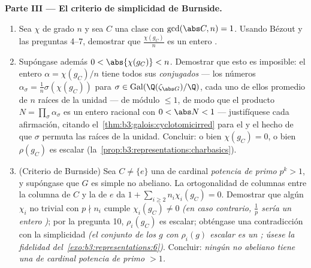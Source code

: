 \begin{problem}
\medskip
\noindent\textbf{Parte III --- El criterio de simplicidad de Burnside.}
\begin{enumerate}[resume]
  \item Sea $\chi$  de
  grado $n$ y sea $C$ una clase con $\gcd(\abs C, n) = 1$. Usando Bézout
  y las preguntas 4--7, demostrar que $\frac{\chi(g_C)}{n}$ es un entero
  . \item Supóngase además
  $0 < \abs{\chi(g_C)} < n$. Demostrar que esto es imposible: el entero
   $\alpha =
        \chi(g_C)/n$ tiene todos sus \emph{conjugados} --- los números
  $\alpha_\sigma = \frac1n\sigma(\chi(g_C))$ para
        $\sigma \in \operatorname{Gal}(\Q(\zeta_{\abs G})/\Q)$,
        cada uno de ellos promedio de $n$ raíces de la unidad --- de
        módulo
        $\leq 1$,
        de modo que el producto $N = \prod_\sigma\alpha_\sigma$ es un
        entero  racional con
        $0 < \abs N < 1$ --- justifíquese cada afirmación, citando
        el~\cref{thm:b3:galois:cyclotomicirred} para el
         y el hecho de que
        $\sigma$ permuta las raíces de la unidad. Concluir: o bien
        $\chi(g_C) = 0$, o bien $\rho(g_C)$ es escalar
        (la~\cref{prop:b3:representations:charbasics}). \item (Criterio
        de Burnside) Sea $C \neq \{e\}$ una
         de cardinal
        \emph{potencia de primo} $p^k > 1$, y supóngase que $G$ es
        simple no abeliano. La ortogonalidad de columnas entre la
        columna de $C$ y la de $e$ da
        $1 + \sum_{i \geq 2} n_i\chi_i(g_C) = 0$. Demostrar que algún
        $\chi_i$ no trivial con $p \nmid n_i$ cumple
        $\chi_i(g_C) \neq 0$ \emph{(en caso contrario, $\frac1p$ sería
        un entero )}; por la
        pregunta 10, $\rho_i(g_C)$ es escalar; obténgase una
        contradicción con la simplicidad \emph{(el conjunto de los $g$
        con $\rho_i(g)$ escalar es un
        ; úsese la
        fidelidad del~\cref{exo:b3:representations:6})}. Concluir:
        \emph{ningún  no abeliano tiene una
         de cardinal
        potencia de primo $> 1$.}
\end{enumerate}


\end{problem}
